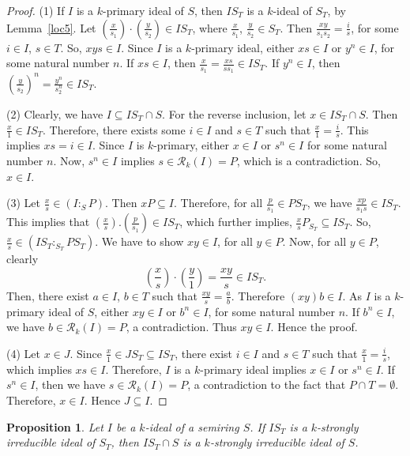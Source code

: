 \documentclass[11pt,leqno]{amsart}
\newtheorem{proposition}[theorem]{Proposition}
\theoremstyle{definition}
\numberwithin{equation}{section}
\begin{document}
\begin{proof}
(1) If $I$ is a $k$-primary ideal of $S$, then $IS_T$ is a $k$-ideal of $S_T$, by Lemma~\ref{loc5}. Let $(\frac{x}{s_1})\cdot(\frac{y}{s_2})\in IS_T$, where $\frac{x}{s_1}$, $\frac{y}{s_2}\in S_T$. Then $\frac{xy}{s_1s_2}=\frac{i}{s}$, for some $i\in I$, $s\in T$. So, $xys\in I$. Since $I$ is a $k$-primary ideal, either $xs\in I$ or $y^n\in I$, for some natural number $n$. If $xs\in I$, then $\frac{x}{s_1}=\frac{xs}{ss_1}\in IS_T$. If $y^n\in I$, then $(\frac{y}{s_2})^n=\frac{y^n}{s_2^n}\in IS_T$.
    
(2) Clearly, we have $I\subseteq IS_T\cap S$. For the reverse inclusion, let $x\in IS_T\cap S$. Then $\frac{x}{1}\in IS_T$. Therefore, there exists some $i\in I$ and $s\in T$ such that $\frac{x}{1}=\frac{i}{s}$. This implies $xs=i\in I$. Since $I$ is $k$-primary, either $x\in I$ or $s^n\in I$ for some natural number $n$. Now, $s^n\in I$ implies $s\in \mathcal{R}_k(I)=P$, which is a contradiction. So, $x\in I$.
    
(3) Let $\frac{x}{s}\in (I:_SP)$. Then $xP\subseteq I$. Therefore, for all $\frac{p}{s_1}\in PS_T$, we have $\frac{xp}{s_1s}\in IS_T$. This implies that $(\frac{x}{s}).(\frac{p}{s_1})\in IS_T$, which further implies, $\frac{x}{s}P_{S_T}\subseteq IS_T$. So, $\frac{x}{s}\in (IS_T:_{S_T} PS_T)$. We have to show $xy\in I$, for all $y\in P$. Now, for all $y\in P$, clearly $$(\frac{x}{s})\cdot(\frac{y}{1})=\frac{xy}{s} \in IS_T.$$ Then, there exist $a\in I$, $b\in T$ such that $\frac{xy}{s}=\frac{a}{b}$. Therefore $(xy)b\in I$. As $I$ is a $k$-primary ideal of $S$, either $xy\in I$ or $b^n\in I$, for some natural number $n$. If $b^n\in I$, we have $b\in \mathcal{R}_k(I)=P$, a contradiction. Thus $xy\in I$. Hence the proof.
    
(4) Let $x\in J$. Since $\frac{x}{1}\in JS_T\subseteq IS_T$, there exist $i\in I$ and $s\in T$ such that $\frac{x}{1}=\frac{i}{s}$, which implies $xs\in I$. Therefore, $I$ is a $k$-primary ideal implies $x\in I$ or $s^n\in I$. If $s^n\in I$, then we have $s\in \mathcal{R}_k(I)=P$, a contradiction to the fact that $P\cap T=\emptyset$. Therefore, $x\in I$. Hence $J\subseteq I$.
\end{proof}

\begin{proposition}\label{loc7}
Let $I$ be a $k$-ideal of a semiring $S$. If $IS_T$ is a $k$-strongly irreducible
ideal of $S_T$, then $IS_T\cap S$ is a $k$-strongly irreducible ideal of $S$.
\end{proposition}
\end{document}
